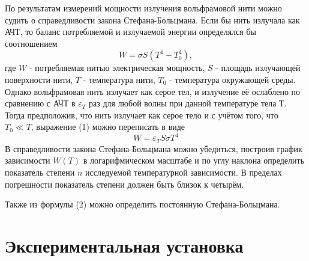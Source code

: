 \documentclass[a4paper, 12pt]{article}%
\begin{document}
По результатам измерений мощности излучения вольфрамовой нити можно судить о справедливости закона Стефана-Больцмана. Если бы нить излучала как АЧТ, то баланс потребляемой и излучаемой энергии определялся бы соотношением 
\begin{equation}
    W = \sigma S (T^4 - T_0^4),
\end{equation}
где $W$ - потребляемая нитью электрическая мощность, $S$ - площадь излучающей поверхности нити, $T$ - температура нити, $T_0$ - температура окружающей среды. Однако вольфрамовая нить излучает как серое тел, и излучение её ослаблено по сравнению с АЧТ в $\varepsilon_T$ раз для любой волны при данной температуре тела Т. Тогда предположив, что нить излучает как серое тело и с учётом того, что $T_0 \ll T$, выражение (1) можно переписать в виде
\begin{equation}
    W = \varepsilon_T S \sigma T^4
\end{equation}
В справедливости закона Стефана-Больцмана можно убедиться, построив график зависимости $W(T)$ в логарифмическом масштабе и по углу наклона определить показатель степени $n$ исследуемой температурной зависимости. В пределах погрешности показатель степени должен быть близок к четырём. \par
Также из формулы (2) можно определить постоянную Стефана-Больцмана.

\section{Экспериментальная установка}
\end{document}
